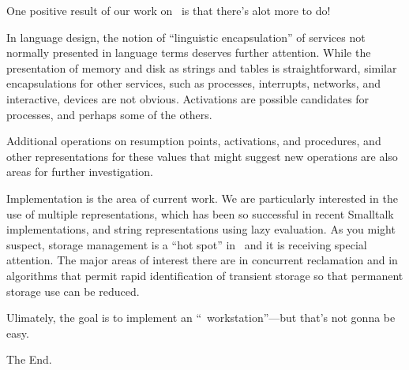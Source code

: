One positive result of our work on \EZ\ is that
there's alot more to do!

In language design, the notion of ``linguistic encapsulation'' of
services not normally presented in language terms deserves further attention.
While the presentation of memory and disk as strings and tables
is straightforward, similar encapsulations for other
services, such as processes, interrupts, networks, and interactive,
devices are not obvious.
Activations are possible candidates for processes, and perhaps
some of the others.

Additional operations on resumption points, activations, and procedures,
and other representations for these values that might suggest new
operations are also areas for further investigation.

Implementation is the area of current work.
We are particularly interested in
the use of multiple representations, which has been so
successful in recent Smalltalk implementations,
and string representations using lazy evaluation.
As you might suspect, storage management
is a ``hot spot'' in \EZ\ and it is receiving special attention.
The major areas of interest there are in concurrent reclamation and
in algorithms that permit rapid identification of
transient storage so that permanent storage use can be reduced.

Ulimately, the goal is to implement an ``\EZ\ workstation''---but
that's not gonna be easy.

The End.
\bye

